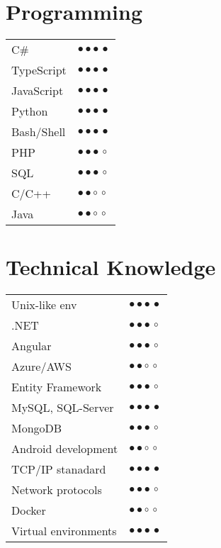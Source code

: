 \documentclass[a4paper,10pt]{article}
\newcommand{\SkillBull}[1]{%
\textcolor{ColorTwo}{#1}
}
\begin{document}
\begin{adjustbox}{valign=t}
\begin{minipage}{0.6\textwidth}
\begin{multicols}{2}
\section*{Programming}
\begin{tabular}{ll}
	C\# 			& \SkillBull{$\bullet \bullet \bullet \, \bullet$}\\
	TypeScript  	& \SkillBull{$\bullet \bullet \bullet \, \bullet$}\\
	JavaScript  	& \SkillBull{$\bullet \bullet \bullet \, \bullet$}\\
	Python   	    & \SkillBull{$\bullet \bullet \bullet \, \bullet$}\\
	Bash/Shell    & \SkillBull{$\bullet \bullet \bullet \, \bullet$}\\
	PHP  		    & \SkillBull{$\bullet \bullet \bullet \, \circ$}\\
	SQL 		    & \SkillBull{$\bullet \bullet \bullet \, \circ$}\\
	C/C++        	& \SkillBull{$\bullet \bullet \circ \, \circ$}\\
	Java        	& \SkillBull{$\bullet \bullet \circ \, \circ$}\\
\end{tabular}

\vfill\null \columnbreak  %

\section*{Technical Knowledge}
\begin{tabular}{ll}
    Unix-like env	    & \SkillBull{$\bullet \bullet \bullet \, \bullet$}\\
	.NET		& \SkillBull{$\bullet \bullet \bullet \, \circ$}\\
	Angular  	& \SkillBull{$\bullet \bullet \bullet \, \circ$}\\
	Azure/AWS		& \SkillBull{$\bullet \bullet \circ \, \circ$}\\
	Entity Framework 	& \SkillBull{$\bullet \bullet \bullet \, \circ$}\\
	MySQL, SQL-Server   & \SkillBull{$\bullet \bullet \bullet \, \bullet$}\\
	MongoDB   	    & \SkillBull{$\bullet \bullet \bullet \, \circ$}\\
	Android development   	    & \SkillBull{$\bullet \bullet \circ \, \circ$}\\
	TCP/IP stanadard	    & \SkillBull{$\bullet \bullet \bullet \, \bullet$}\\
	Network protocols	    & \SkillBull{$\bullet \bullet \bullet \, \circ$}\\
	Docker	    & \SkillBull{$\bullet \bullet \circ \, \circ$}\\
	Virtual environments	    & \SkillBull{$\bullet \bullet \bullet \, \bullet$}\\
\end{tabular}
\end{multicols}
\end{minipage}
\end{adjustbox}
\end{document}
